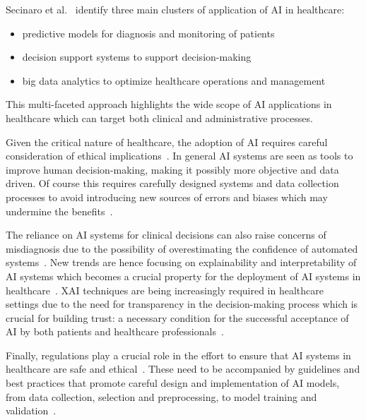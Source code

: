 Secinaro et al.~\cite{Secinaro_Calandra_Secinaro_Muthurangu_Biancone_2021} identify three main clusters of application of \ac{AI} in healthcare:
\begin{itemize}
    \item predictive models for diagnosis and monitoring of patients
    \item decision support systems to support decision-making
    \item big data analytics to optimize healthcare operations and management
\end{itemize}

This multi-faceted approach highlights the wide scope of \ac{AI} applications in healthcare which can target both clinical and administrative processes.

Given the critical nature of healthcare, the adoption of \ac{AI} requires careful consideration of ethical implications~\cite{Morley_Machado_Burr_Cowls_Joshi_Taddeo_Floridi_2020}.
%
In general \ac{AI} systems are seen as tools to improve human decision-making, making it possibly more objective and data driven.
%
Of course this requires carefully designed systems and data collection processes to avoid introducing new sources of errors and biases which may undermine the benefits~\cite{Norori_Hu_Aellen_Faraci_Tzovara_2021}.

The reliance on \ac{AI} systems for clinical decisions can also raise concerns of misdiagnosis due to the possibility of overestimating the confidence of automated systems~\cite{Morley_Machado_Burr_Cowls_Joshi_Taddeo_Floridi_2020}.
%
New trends are hence focusing on explainability and interpretability of \ac{AI} systems which becomes a crucial property for the deployment of \ac{AI} systems in healthcare~\cite{Bharati_Mondal_Podder_2024}.
%
\ac{XAI} techniques are being increasingly required in healthcare~\cite{Freyer_Groß_Lipprandt_2024} settings due to the need for transparency in the decision-making process which is crucial for building trust: a necessary condition for the successful acceptance of \ac{AI} by both patients and healthcare professionals~\cite{Alonso_Astobiza_Ortega_Lozano_2025}.

Finally, regulations play a crucial role in the effort to ensure that \ac{AI} systems in healthcare are safe and ethical~\cite{Freyer_Groß_Lipprandt_2024}.
%
These need to be accompanied by guidelines and best practices that promote careful design and implementation of \ac{AI} models, from data collection, selection and preprocessing, to model training and validation~\cite{de_Hond_Leeuwenberg_Hooft_Kant_Nijman_van_Os_Aardoom_Debray_Schuit_van_Smeden_et_al._2022}.


